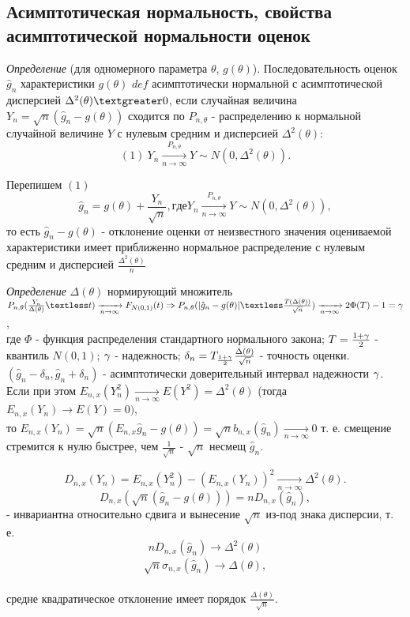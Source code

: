 \subsection{Асимптотическая нормальность, свойства асимптотической нормальности оценок}

\textit{Определение} (для одномерного параметра $\theta$, $g(\theta)$).
Последовательность оценок $\hat{g}_n$ характеристики $g(\theta)$ $def$ асимптотически нормальной с асимптотической дисперсией $\Delta^2(\theta) \textgreater 0$, если случайная величина $Y_n = \sqrt{n}(\hat{g}_n - g(\theta))$ сходится по $P_{n, \theta}$ - распределению к нормальной случайной величине $Y$ с нулевым средним и дисперсией $\Delta^2(\theta)$:
\[
  (1)~ Y_n \xrightarrow[n \to \infty]{P_{n, \theta}} Y \sim N(0, \Delta^2(\theta))
.\]

Перепишем $(1)$
\[
  \hat{g}_n = g(\theta) + \frac{Y_n}{\sqrt{n}}, где Y_n \xrightarrow[n \to \infty]{P_{n, \theta}} Y \sim N(0, \Delta^2(\theta))
,\] то есть
$\hat{g}_n - g(\theta)$ - отклонение оценки от неизвестного значения оцениваемой характеристики имеет приближенно нормальное распределение с нулевым средним и дисперсией $\frac{\Delta^2(\theta)}{n}$


\textit{Определение} $\Delta(\theta)$ нормирующий множитель \\
$P_{n, \theta}(\frac{Y_n}{\Delta(\theta)} \textless t) \xrightarrow[n \to \infty]{} F_{N(0, 1)}(t) \Rightarrow{} P_{n, \theta}(|\hat{g}_n - g(\theta)| \textless \frac{T(\Delta(\theta))} {\sqrt{n}}) \xrightarrow[n \to \infty]{} 2\Phi(T) - 1 = \g$, \\
где $\Phi$ - функция распределения стандартного нормального закона; $T = \frac{1 + \gamma}{2}$ - квантиль $N(0, 1)$;
$\gamma$ - надежность; $\delta_n = T_{\frac{1 + \gamma}{2}}\frac{\Delta(\theta)}{\sqrt{n}}$ - точность оценки. \\
$(\hat{g}_n - \delta_n, \hat{g}_n + \delta_n)$ - асимптотически доверительный интервал надежности $\gamma$. \\
Если при этом $E_{n, x}(Y_n^2) \xrightarrow[n \to \infty]{} E(Y^2) = \Delta^2(\theta)$ (тогда $E_{n, x}(Y_n) \xrightarrow[]{} E(Y) = 0)$, \\
то $E_{n, x}(Y_n) = \sqrt{n}(E_{n, x}\hat{g}_n - g(\theta))
 = \sqrt{n}b_{n, x}(\hat{g}_n) \xrightarrow[n \to \infty]{} 0$
 т. е. смещение стремится к нулю быстрее, чем $\frac{1}{\sqrt{n}}$
- $\sqrt{n}$ несмещ $\hat{g}_n$.

\[
  D_{n, x}(Y_n) = E_{n, x}(Y_n^2) - (E_{n, x}(Y_n))^2 \xrightarrow[n \to \infty]{} \Delta^2(\theta)
.\]
\[
  D_{n, x}(\sqrt{n}(\hat{g}_n - g(\theta))) = nD_{n, x}(\hat{g}_n)
,\] - инвариантна относительно сдвига и вынесение $\sqrt{n}$ из-под знака дисперсии,
т. е.
\[
  nD_{n, x}(\hat{g}_n) \xrightarrow[]{} \Delta^2(\theta)
\]
\[
  \sqrt{n}\sigma_{n, x}(\hat{g}_n) \xrightarrow[]{} \Delta(\theta)
,\] \\
средне квадратическое отклонение имеет порядок $\frac{\Delta(\theta)}{\sqrt{n}}$.

